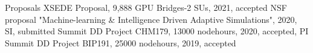 \begin{rubric}{Proposals}
\entry*[\hspace{1.7cm} ]%
  XSEDE Proposal, 9,888 GPU Bridges-2 SUs, 2021, accepted
\entry*[\hfill]%
  NSF proposal "Machine-learning \& Intelligence Driven Adaptive Simulations", 2020, SI, submitted 
\entry*[\hfill]%
  Summit DD Project CHM179, 13000 nodehours, 2020, accepted, PI
\entry*[\hfill]%
  Summit DD Project BIP191, 25000 nodehours, 2019, accepted 


\end{rubric}